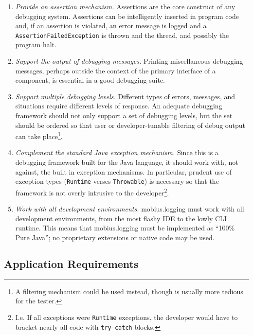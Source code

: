 \documentclass{article}
\begin{document}
\begin{enumerate}
\item \emph{Provide an assertion mechanism.}  Assertions are the core
  construct of any debugging system.  Assertions can be intelligently inserted
  in program code and, if an assertion is violated, an error message is logged
  and a \texttt{AssertionFailedException} is thrown and the thread, and
  possibly the program halt.
\item \emph{Support the output of debugging messages.}  Printing
  miscellaneous debugging messages, perhaps outside the context of the
  primary interface of a component, is essential in a good debugging
  suite.
\item \emph{Support multiple debugging levels.} Different types of
  errors, messages, and situations require different levels of
  response.  An adequate debugging framework should not only support a
  set of debugging levels, but the set should be ordered so that user
  or developer-tunable filtering of debug output can take
  place\footnote{A filtering mechanism could be used instead, though
  is usually more tedious for the tester.}.
\item \emph{Complement the standard Java exception mechanism.} Since
  this is a debugging framework built for the Java language, it should
  work with, not against, the built in exception mechanisms.  In
  particular, prudent use of exception types (\texttt{Runtime} verses
  \texttt{Throwable}) is necessary so that the framework is not overly
  intrusive to the developer\footnote{I.e. If all exceptions were
  \texttt{Runtime} exceptions, the developer would have to bracket
  nearly all code with \texttt{try-catch} blocks.}.
\item \emph{Work with all development environments.}  mobius.logging must work
  with all development environments, from the most flashy IDE to the
  lowly CLI runtime.  This means that mobius.logging must be implemented as
  ``100\% Pure Java''; no proprietary extensions or native code may
  be used.
\end{enumerate}

\subsection{Application Requirements}
\end{document}
